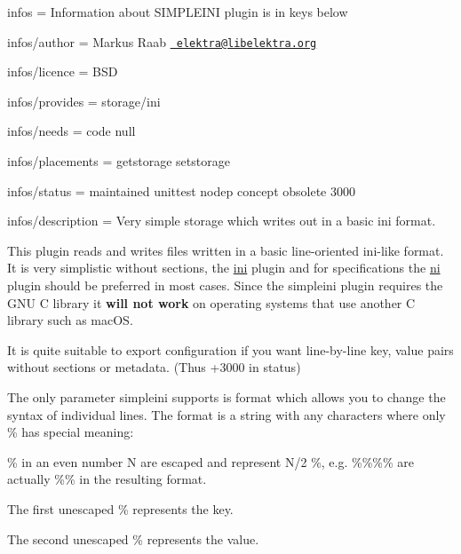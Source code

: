 
\begin{DoxyItemize}
\item infos = Information about S\+I\+M\+P\+L\+E\+I\+NI plugin is in keys below
\item infos/author = Markus Raab \href{mailto:elektra@libelektra.org}{\texttt{ elektra@libelektra.\+org}}
\item infos/licence = B\+SD
\item infos/provides = storage/ini
\item infos/needs = code null
\item infos/placements = getstorage setstorage
\item infos/status = maintained unittest nodep concept obsolete 3000
\item infos/description = Very simple storage which writes out in a basic ini format.
\end{DoxyItemize}

This plugin reads and writes files written in a basic line-\/oriented ini-\/like format. It is very simplistic without sections, the \mbox{\hyperlink{autotoc_md292_src_plugins_ini_README_md}{ini}} plugin and for specifications the \mbox{\hyperlink{autotoc_md500_src_plugins_ni_README_md}{ni}} plugin should be preferred in most cases. Since the {\ttfamily simpleini} plugin requires the G\+NU C library it {\bfseries{will not work}} on operating systems that use another C library such as mac\+OS.

It is quite suitable to export configuration if you want line-\/by-\/line key, value pairs without sections or metadata. (Thus +3000 in status)


\begin{DoxyCode}{0}
\end{DoxyCode}


The only parameter simpleini supports is {\ttfamily format} which allows you to change the syntax of individual lines. The {\ttfamily format} is a string with any characters where only {\ttfamily \%} has special meaning\+:


\begin{DoxyItemize}
\item {\ttfamily \%} in an even number N are escaped and represent N/2 {\ttfamily \%}, e.\+g. {\ttfamily \%\%\%\%} are actually {\ttfamily \%\%} in the resulting format.
\item The first unescaped {\ttfamily \%} represents the key.
\item The second unescaped {\ttfamily \%} represents the value.
\end{DoxyItemize}

